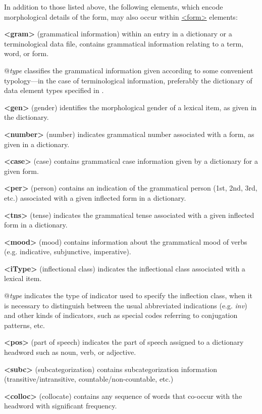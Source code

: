 \par
In addition to those listed above, the following elements, which encode morphological details of the form, may also occur within \hyperref[TEI.form]{<form>} elements:
\begin{sansreflist}
  
\item [\textbf{<gram>}] (grammatical information) within an entry in a dictionary or a terminological data file, contains grammatical information relating to a term, word, or form.\hfil\\[-10pt]\begin{sansreflist}
    \item[@{\itshape type}]
  classifies the grammatical information given according to some convenient typology—in the case of terminological information, preferably the dictionary of data element types specified in .
\end{sansreflist}  
\item [\textbf{<gen>}] (gender) identifies the morphological gender of a lexical item, as given in the dictionary.
\item [\textbf{<number>}] (number) indicates grammatical number associated with a form, as given in a dictionary.
\item [\textbf{<case>}] (case) contains grammatical case information given by a dictionary for a given form.
\item [\textbf{<per>}] (person) contains an indication of the grammatical person (1st, 2nd, 3rd, etc.) associated with a given inflected form in a dictionary.
\item [\textbf{<tns>}] (tense) indicates the grammatical tense associated with a given inflected form in a dictionary.
\item [\textbf{<mood>}] (mood) contains information about the grammatical mood of verbs (e.g. indicative, subjunctive, imperative).
\item [\textbf{<iType>}] (inflectional class) indicates the inflectional class associated with a lexical item.\hfil\\[-10pt]\begin{sansreflist}
    \item[@{\itshape type}]
  indicates the type of indicator used to specify the inflection class, when it is necessary to distinguish between the usual abbreviated indications (e.g. \textit{inv}) and other kinds of indicators, such as special codes referring to conjugation patterns, etc.
\end{sansreflist}  
\item [\textbf{<pos>}] (part of speech) indicates the part of speech assigned to a dictionary headword such as noun, verb, or adjective.
\item [\textbf{<subc>}] (subcategorization) contains subcategorization information (transitive/intransitive, countable/non-countable, etc.)
\item [\textbf{<colloc>}] (collocate) contains any sequence of words that co-occur with the headword with significant frequency.
\end{sansreflist}
